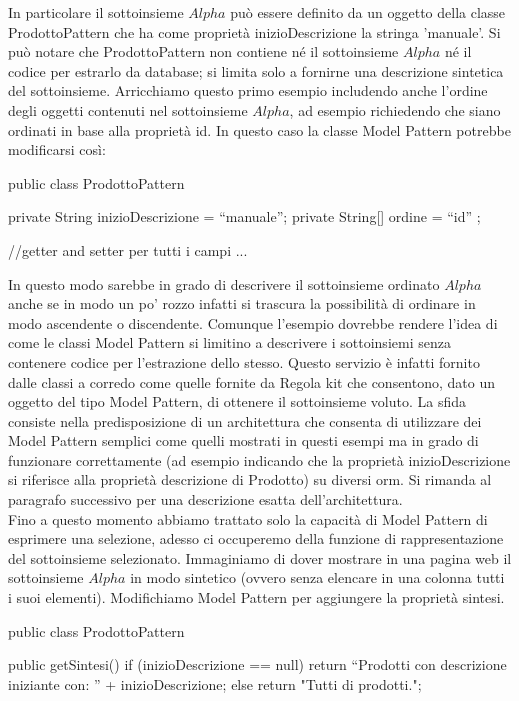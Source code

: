 In particolare il sottoinsieme $Alpha$ può essere definito da un oggetto della classe ProdottoPattern che ha come proprietà inizioDescrizione la stringa 'manuale'. Si può notare che ProdottoPattern non contiene né il sottoinsieme $Alpha$ né il codice per estrarlo da database; si limita solo a fornirne una descrizione sintetica del sottoinsieme.
Arricchiamo questo primo esempio includendo anche l'ordine degli oggetti contenuti nel sottoinsieme $Alpha$, ad esempio richiedendo che siano ordinati in base alla proprietà id. In questo caso la classe Model Pattern potrebbe modificarsi così:

\begin{java}
public class ProdottoPattern  {
    
    private String inizioDescrizione = ``manuale'';
    private String[] ordine = { ``id'' }; 

    //getter and setter per tutti i campi
    ...
}
\end{java}

In questo modo sarebbe in grado di descrivere il sottoinsieme ordinato $Alpha$ anche se in modo un po' rozzo infatti si trascura la possibilità di ordinare in modo ascendente o discendente. Comunque l'esempio dovrebbe rendere l'idea di come le classi Model Pattern si limitino a descrivere i sottoinsiemi senza contenere codice per l'estrazione dello stesso. Questo servizio è infatti fornito dalle classi a corredo come quelle fornite da Regola kit che consentono, dato un oggetto del tipo Model Pattern, di ottenere il sottoinsieme voluto. La sfida consiste nella predisposizione di un architettura che consenta di utilizzare dei Model Pattern semplici come quelli mostrati in questi esempi ma in grado di funzionare correttamente (ad esempio indicando che la proprietà inizioDescrizione si riferisce alla proprietà descrizione di Prodotto) su diversi orm. Si rimanda al paragrafo successivo per una descrizione esatta dell'architettura.\\
Fino a questo momento abbiamo trattato solo la capacità di Model Pattern di esprimere una selezione, adesso ci occuperemo della funzione di rappresentazione del sottoinsieme selezionato. Immaginiamo di dover mostrare in una pagina web il sottoinsieme $Alpha$ in modo sintetico (ovvero senza elencare in una colonna tutti i suoi elementi). Modifichiamo Model Pattern per aggiungere la proprietà sintesi.

\begin{java}
public class ProdottoPattern  {
    
    public getSintesi()
    {
       if (inizioDescrizione == null)
       {
          return ``Prodotti con descrizione iniziante con: '' +  inizioDescrizione;
       }
       else
       {
          return "Tutti di prodotti.";
       }
    }

}
\end{java} 

